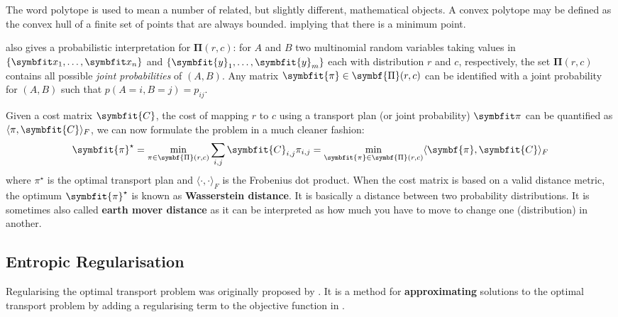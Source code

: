 \begin{tcolorbox}[title=Polytope]
The word polytope is used to mean a number of related, but slightly different, mathematical objects. A convex polytope may be defined as the convex hull of a finite set of points that are always bounded.  implying that there is a minimum point.
\end{tcolorbox}

\textcite{cuturi2013sinkhorn} also gives a probabilistic interpretation for $\symbf{\Pi}(r, c)$: for $A$ and $B$ two multinomial random variables taking values in  $\{\bfitx_1, \ldots, \bfitx_n\}$ and  $\{\symbfit{y}_1, \ldots, \symbfit{y}_m\}$ each with distribution $r$ and $c$, respectively, the set $\symbf{\Pi}(r, c)$ contains all possible \textit{joint probabilities} of $(A, B)$. Any matrix $\symbfit{\pi} \in \symbf{\Pi}(r, c)$ can be identified with a joint probability for $(A, B)$ such that $p(A = i, B = j) = p_{ij}$.

Given a cost matrix $\symbfit{C}$, the cost of mapping $r$ to $c$ using a transport plan (or joint probability) $\symbfit \pi$ can be quantified as $\langle \pi, \symbfit{C} \rangle_{F}$, we can now formulate the problem in a much cleaner fashion:
\begin{equation}
    \symbfit{\pi}^\star = \min_{\pi \in \symbf{\Pi}(r, c)} \sum_{i,j} \symbfit{C}_{i,j}{\pi}_{i,j} = \min_{\symbfit{\pi} \in \symbf{\Pi}(r, c)} \langle \symbf{\pi}, \symbfit{C} \rangle_{F}
    \label{eqn:ot-objective-relaxed}
\end{equation}
where $\pi^\star$ is the optimal transport plan and $\langle \cdot, \cdot \rangle_{F}$ is the Frobenius dot product. When the cost matrix is based on a valid distance metric, the optimum $\symbfit{\pi}^\star$ is known as \textbf{Wasserstein distance}. It is basically a distance between two probability distributions. It is sometimes also called \textbf{earth mover distance} as it can be interpreted as how much  you have to move to change one  (distribution) in another.

\subsection{Entropic Regularisation}\label{ssec:ot-entropic-reg}

Regularising the optimal transport problem was originally proposed by \textcite{hitchcock1941distribution}. It is a method for \textbf{approximating} solutions to the optimal transport problem by adding a regularising term to the objective function in .

